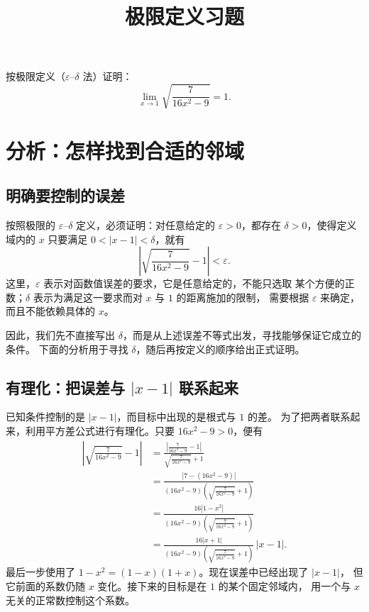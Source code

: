 \documentclass[UTF8,12pt,a4paper,fontset=fandol]{ctexart}
\title{极限定义习题}
\author{}
\date{}
\begin{document}
\maketitle

按极限定义（$\varepsilon$--$\delta$ 法）证明：
\[
  \lim_{x\to 1}\sqrt{\frac{7}{16x^2-9}}=1.
\]

\section{分析：怎样找到合适的邻域}

\subsection{明确要控制的误差}

按照极限的 $\varepsilon$--$\delta$ 定义，必须证明：对任意给定的
$\varepsilon>0$，都存在 $\delta>0$，使得定义域内的 $x$ 只要满足
$0<|x-1|<\delta$，就有
\[
  \left|\sqrt{\frac{7}{16x^2-9}}-1\right|<\varepsilon.
\]
这里，$\varepsilon$ 表示对函数值误差的要求，它是任意给定的，不能只选取
某个方便的正数；$\delta$ 表示为满足这一要求而对 $x$ 与 $1$ 的距离施加的限制，
需要根据 $\varepsilon$ 来确定，而且不能依赖具体的 $x$。

因此，我们先不直接写出 $\delta$，而是从上述误差不等式出发，寻找能够保证它成立的条件。
下面的分析用于寻找 $\delta$，随后再按定义的顺序给出正式证明。

\subsection{有理化：把误差与 \texorpdfstring{$|x-1|$}{|x-1|} 联系起来}

已知条件控制的是 $|x-1|$，而目标中出现的是根式与 $1$ 的差。
为了把两者联系起来，利用平方差公式进行有理化。只要 $16x^2-9>0$，便有
\begin{align*}
  \left|\sqrt{\frac{7}{16x^2-9}}-1\right|
  &=\frac{\left|\frac{7}{16x^2-9}-1\right|}
          {\sqrt{\frac{7}{16x^2-9}}+1}\\
  &=\frac{|7-(16x^2-9)|}
          {(16x^2-9)\left(\sqrt{\frac{7}{16x^2-9}}+1\right)}\\
  &=\frac{16|1-x^2|}
          {(16x^2-9)\left(\sqrt{\frac{7}{16x^2-9}}+1\right)}\\
  &=\frac{16|x+1|}
          {(16x^2-9)\left(\sqrt{\frac{7}{16x^2-9}}+1\right)}\,|x-1|.
\end{align*}
最后一步使用了 $1-x^2=(1-x)(1+x)$。现在误差中已经出现了 $|x-1|$，
但它前面的系数仍随 $x$ 变化。接下来的目标是在 $1$ 的某个固定邻域内，
用一个与 $x$ 无关的正常数控制这个系数。
\end{document}
